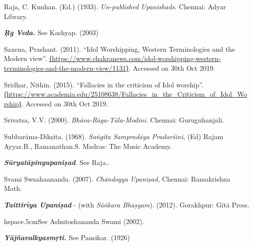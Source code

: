 \begin{thebibliography}{99}
  Raja, C. Kunhan. (Ed.) (1933). \textit{Un-published Upanishads.} Chennai: Adyar Library.

  \textbf{\textit{Ṛg Veda.}} See Kashyap. (2003)

  Saxena, Prashant. (2011). “Idol Worshipping, Western Terminologies and the Modern view”. \url{⟨https://www.chakranews.com/idol-worshipping-western-terminologies-and-the-modern-view/1131⟩}. Accessed on 30th Oct 2019.

  Sridhar, Nithin. (2015). “Fallacies in the criticism of Idol worship”. \url{⟨https://www.academia.edu/25108638/Fallacies_in_the_Criticism_of_Idol_Worship⟩}. Accessed on 30th Oct 2019.

  Srivatsa, V.V. (2000). \textit{Bhāva-Rāga-Tāla-Modini}. Chennai: Guruguhanjali.

  Subbarāma-Dīkṣita. (1968). \textit{Saṅgīta Sampradāya Pradarśini}, (Ed) Rajam Ayyar.B., Ramanathan.S. Madras: The Music Academy.

  \textbf{\textit{Sūryatāpinyupaniṣad}}. See Raja..

  Svami Swaahaananda. (2007).\textit{ Chāndogya Upaniṣad,} Chennai: Rama\-krishna Math.

  \textbf{\textit{Taittirīya Upaniṣad}} - (with \textit{Sāṅkara Bhaṣyam}). (2012). Gorakhpur: Gītā Press.

  hspace{.5cm}See Ashutoshananda Swami (2002).

  \textbf{\textit{Yājñavalkyasmṛti.}} See Pansikar. (1926)

 \end{thebibliography}

